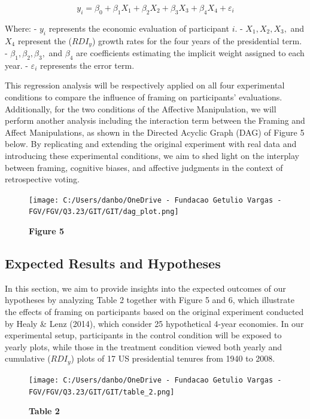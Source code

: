 \documentclass[
]{article}
\begin{document}
\[
y_i = \beta_0 + \beta_1 X_1 + \beta_2 X_2 + \beta_3 X_3 + \beta_4 X_4 + \varepsilon_i
\]

Where: - \(y_i\) represents the economic evaluation of participant
\(i\). - \(X_1, X_2, X_3,\) and \(X_4\) represent the (\(RDI_y\)) growth
rates for the four years of the presidential term. -
\(\beta_1, \beta_2, \beta_3,\) and \(\beta_4\) are coefficients
estimating the implicit weight assigned to each year. -
\(\varepsilon_i\) represents the error term.

This regression analysis will be respectively applied on all four
experimental conditions to compare the influence of framing on
participants' evaluations. Additionally, for the two conditions of the
Affective Manipulation, we will perform another analysis including the
interaction term between the Framing and Affect Manipulations, as shown
in the Directed Acyclic Graph (DAG) of Figure 5 below. By replicating
and extending the original experiment with real data and introducing
these experimental conditions, we aim to shed light on the interplay
between framing, cognitive biases, and affective judgments in the
context of retrospective voting.

\begin{figure}
\centering
\texttt{[image: C:/Users/danbo/OneDrive - Fundacao Getulio Vargas - FGV/FGV/Q3.23/GIT/GIT/dag\_plot.png]}
\caption{\textbf{Figure 5}}
\end{figure}

\hypertarget{expected-results-and-hypotheses}{%
\subsection{Expected Results and
Hypotheses}\label{expected-results-and-hypotheses}}

In this section, we aim to provide insights into the expected outcomes
of our hypotheses by analyzing Table 2 together with Figure 5 and 6,
which illustrate the effects of framing on participants based on the
original experiment conducted by Healy \& Lenz (2014), which consider 25
hypothetical 4-year economies. In our experimental setup, participants
in the control condition will be exposed to yearly plots, while those in
the treatment condition viewed both yearly and cumulative (\(RDI_y\))
plots of 17 US presidential tenures from 1940 to 2008.

\begin{figure}
\centering
\texttt{[image: C:/Users/danbo/OneDrive - Fundacao Getulio Vargas - FGV/FGV/Q3.23/GIT/GIT/table\_2.png]}
\caption{\textbf{Table 2}}
\end{figure}
\end{document}
